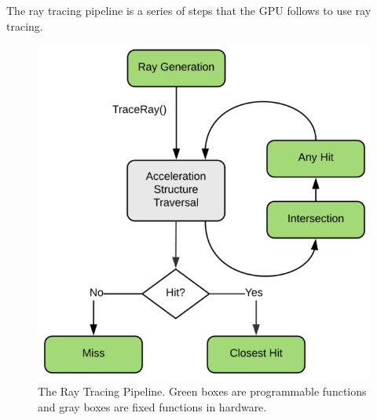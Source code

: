 \documentclass[12pt]{article}
\begin{document}
The ray tracing pipeline is a series of steps that the GPU follows to use ray tracing.

\begin{figure}[H]
    \begin{center}
        \includegraphics[scale=0.25]{RayTracing-Pipeline}
    \end{center}
    \caption{
        The Ray Tracing Pipeline.
        Green boxes are programmable functions and gray boxes are fixed functions in hardware.
        \parencite{NVIDIA:DXR-Intro}
    }
    \label{fig:RayTracing-Pipeline}
\end{figure}
\end{document}
